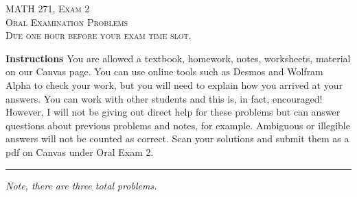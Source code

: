 \documentclass[12pt]{amsbook}
\begin{document}

\begin{center}
   \textsc{\large MATH 271, Exam 2}\\
   \textsc{Oral Examination Problems}\\
   \textsc{Due one hour before your exam time slot.}
\end{center}

\vspace{1cm}

\noindent\textbf{Instructions} \; You are allowed a textbook, homework, notes, worksheets, material on our Canvas page.  You can use online tools such as Desmos and Wolfram Alpha to check your work, but you will need to explain how you arrived at your answers.  You can work with other students and this is, in fact, encouraged! However, I will not be giving out direct help for these problems but can answer questions about previous problems and notes, for example. Ambiguous or illegible answers will not be counted as correct. Scan your solutions and submit them as a pdf on Canvas under Oral Exam 2.


\vspace{1cm}


\hrule

\vspace*{1cm}
\noindent\emph{Note, there are three total problems.}

\newpage
\end{document}
